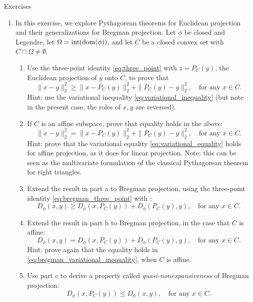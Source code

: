 \begin{xcb}{Exercises}
\begin{enumerate}[label=\thechapter.\arabic*]
\item \label{ex:bregman_pythagorean_theorem}
  In this exercise, we explore Pythagorean theorems for Euclidean projection and
  their generalizations for Bregman projection. Let $\phi$ be closed and
  Legendre, let $\Omega = \operatorname{int}(\operatorname{dom}(\phi))$, and let $C$ be a closed convex
  set with $C \cap \Omega \not= \emptyset$. 

\begin{enumerate}[label=\alph*.]
\item Use the three-point identity \eqref{eq:three_point} with $z = P_C(y)$,
  the Euclidean projection of $y$ onto $C$, to prove that   
  \[
  \|x-y\|_2^2 \geq \|x - P_C(y)\|_2^2 + \|P_C(y) - y\|_2^2, \quad \text{for any
    $x \in C$}. 
  \]
  Hint: use the variational inequality \eqref{eq:variational_inequality} (but
  note in the present case, the roles of $x,y$ are reversed). 

\item If $C$ is an affine subspace, prove that equality holds in the above:  
  \[
  \|x-y\|_2^2 = \|x - P_C(y)\|_2^2 + \|P_C(y) - y\|_2^2, \quad \text{for any
    $x \in C$}. 
  \]
  Hint: prove that the variational equality \eqref{eq:variational_equality}
  holds for affine projection, as it does for linear projection. Note: this can
  be seen as the multivariate formulation of the classical Pythagorean theorem
  for right triangles.  

\item Extend the result in part a to Bregman projection, using the three-point
  identity \eqref{eq:bregman_three_point} with :
  \[
  D_\phi(x,y) \geq D_\phi(x,P_C(y)) + D_\phi(P_C(y),y), \quad \text{for any $x
    \in C$}.  
  \]

\item Extend the result in part b to Bregman projection, in the case that $C$ is
  affine: 
  \[
  D_\phi(x,y) = D_\phi(x,P_C(y)) + D_\phi(P_C(y),y), \quad \text{for any $x
    \in C$}.  
  \]
  Hint: prove again that the equality holds in
  \eqref{eq:bregman_variational_inequality}, when $C$ is affine.

\item Use part c to derive a property called \emph{quasi-nonexpansiveness} of
  Bregman projection: 
  \[
  D_\phi(x,P_C(y)) \leq D_\phi(x,y), \quad \text{for any $x \in C$}.  
  \]
\end{enumerate}


\end{enumerate}
\end{xcb}
